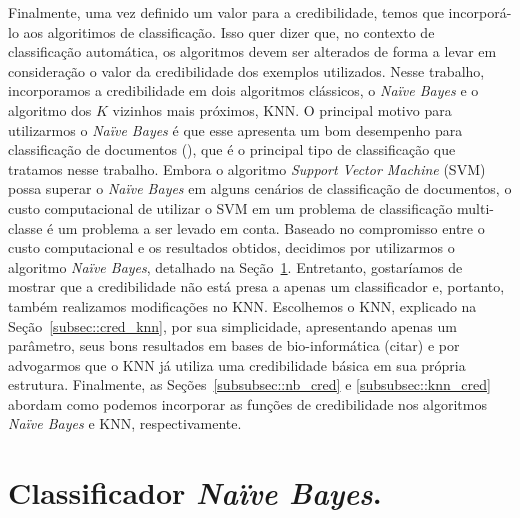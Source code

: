 Finalmente, uma vez definido um valor para a credibilidade, temos que incorporá-lo aos algoritimos de classificação. Isso quer dizer que, no contexto de classificação automática, os algoritmos devem ser alterados de forma a levar em consideração o valor da credibilidade dos exemplos utilizados. Nesse trabalho, incorporamos a credibilidade em dois algoritmos clássicos, o \textit{Naïve Bayes} e o algoritmo dos $K$ vizinhos mais próximos, \textsc{KNN}. O principal motivo para utilizarmos o \textit{Naïve Bayes} é que esse apresenta um bom desempenho  para classificação de documentos (\cite{salles10}), que é o principal tipo de classificação que tratamos nesse trabalho. Embora o algoritmo \textit{Support Vector Machine} (\textsc{SVM}) possa superar o \textit{Naïve Bayes} em alguns cenários de classificação de documentos, o custo computacional de utilizar o \textsc{SVM} em um problema de classificação multi-classe é um problema a ser levado em conta. Baseado no compromisso entre o custo computacional e os resultados obtidos, decidimos por utilizarmos o algoritmo \textit{Naïve Bayes}, detalhado na Seção~\ref{subsec::cred_nb}. Entretanto, gostaríamos de mostrar que a credibilidade não está presa a apenas um classificador e, portanto, também realizamos modificações no \textsc{KNN}. Escolhemos o \textsc{KNN}, explicado na Seção~\ref{subsec::cred_knn}, por sua simplicidade, apresentando apenas um parâmetro, seus bons resultados em bases de bio-informática (citar) e por advogarmos que o \textsc{KNN} já utiliza uma credibilidade básica em sua própria estrutura. Finalmente, as Seções~\ref{subsubsec::nb_cred} e \ref{subsubsec::knn_cred} abordam como podemos incorporar as funções de credibilidade nos algoritmos \textit{Naïve Bayes} e \textsc{KNN}, respectivamente.


\section{Classificador \textit{Naïve Bayes}.}
\label{subsec::cred_nb}


